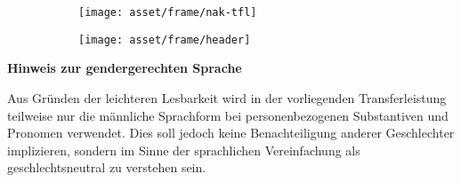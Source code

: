 \pagebreak
\thispagestyle{empty}

\setlength{\parindent}{0pt}

\begin{figure}[t]
	\vspace*{-2.9\baselineskip}
	\begin{subfigure}[b]{0.6\textwidth}
		\texttt{[image: asset/frame/nak-tfl]}
	\end{subfigure}
	\begin{subfigure}[b]{0.4\textwidth}
		\texttt{[image: asset/frame/header]}
	\end{subfigure}
\end{figure}
\begin{figure}[t]
\end{figure}


\vspace*{\fill}

\large
\textcolor{blue!30!black}{\textbf{Hinweis zur gendergerechten Sprache}}
\newline

\normalsize
Aus Gründen der leichteren Lesbarkeit wird in der vorliegenden Transferleistung teilweise nur die männliche Sprachform bei personenbezogenen Substantiven und Pronomen verwendet. Dies soll jedoch keine Benachteiligung anderer Geschlechter implizieren, sondern im Sinne der sprachlichen Vereinfachung als geschlechtsneutral zu verstehen sein. 

\vspace*{\fill}
